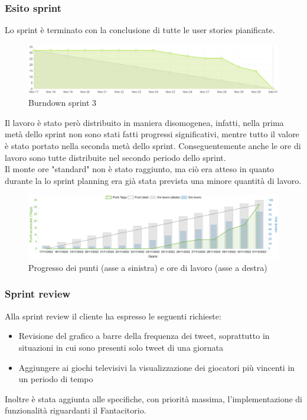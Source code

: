 \newpage
\subsubsection{Esito sprint}
Lo sprint è terminato con la conclusione di tutte le user stories pianificate.\\
\begin{figure}[H]
    \centering
    \includegraphics[width=15cm]{./img/sprint3/burndown.png}
    \caption{Burndown sprint 3}
\end{figure}
Il lavoro è stato però distribuito in maniera disomogenea, infatti, nella prima metà dello sprint non sono stati fatti progressi significativi,
mentre tutto il valore è stato portato nella seconda metà dello sprint. 
Conseguentemente anche le ore di lavoro sono tutte distribuite nel secondo periodo dello sprint.\\
Il monte ore "standard" non è stato raggiunto, ma ciò era atteso in quanto durante la lo sprint planning era già stata prevista una minore quantità di lavoro.
\begin{figure}[H]
    \centering
    \includegraphics[width=15cm]{./img/sprint3/worktime.png}
    \caption{Progresso dei punti (asse a sinistra) e ore di lavoro (asse a destra)}
\end{figure}


\subsubsection{Sprint review}
Alla sprint review il cliente ha espresso le seguenti richieste:
\begin{itemize}
    \item Revisione del grafico a barre della frequenza dei tweet, soprattutto in situazioni in cui sono presenti solo tweet di una giornata
    \item Aggiungere ai giochi televisivi la visualizzazione dei giocatori più vincenti in un periodo di tempo
\end{itemize} 
Inoltre è stata aggiunta alle specifiche, con priorità massima, l'implementazione di funzionalità riguardanti il Fantacitorio.


